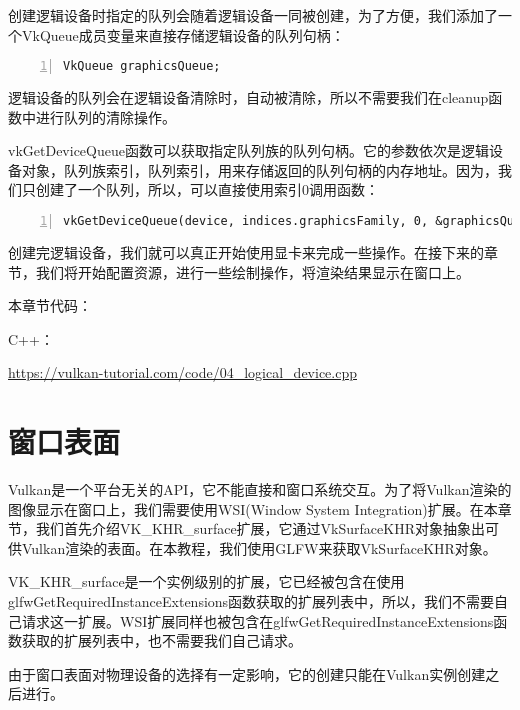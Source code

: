 \documentclass{ctexart}
\begin{document}
创建逻辑设备时指定的队列会随着逻辑设备一同被创建，为了方便，我们添加了一个VkQueue成员变量来直接存储逻辑设备的队列句柄：

\begin{lstlisting}[language={[ANSI]C},keywordstyle=\color{blue!70},commentstyle=\color{red!50!green!50!blue!50},frame=shadowbox, rulesepcolor=\color{red!20!green!20!blue!20},basicstyle=\small,numbers=left, numberstyle=\tiny,breaklines=true]
VkQueue graphicsQueue;
\end{lstlisting}

逻辑设备的队列会在逻辑设备清除时，自动被清除，所以不需要我们在cleanup函数中进行队列的清除操作。

vkGetDeviceQueue函数可以获取指定队列族的队列句柄。它的参数依次是逻辑设备对象，队列族索引，队列索引，用来存储返回的队列句柄的内存地址。因为，我们只创建了一个队列，所以，可以直接使用索引0调用函数：

\begin{lstlisting}[language={[ANSI]C},keywordstyle=\color{blue!70},commentstyle=\color{red!50!green!50!blue!50},frame=shadowbox, rulesepcolor=\color{red!20!green!20!blue!20},basicstyle=\small,numbers=left, numberstyle=\tiny,breaklines=true]
vkGetDeviceQueue(device, indices.graphicsFamily, 0, &graphicsQueue);
\end{lstlisting}

创建完逻辑设备，我们就可以真正开始使用显卡来完成一些操作。在接下来的章节，我们将开始配置资源，进行一些绘制操作，将渲染结果显示在窗口上。

本章节代码：

C++：

\url{https://vulkan-tutorial.com/code/04_logical_device.cpp}

\newpage
\section{窗口表面}

Vulkan是一个平台无关的API，它不能直接和窗口系统交互。为了将Vulkan渲染的图像显示在窗口上，我们需要使用WSI(Window System Integration)扩展。在本章节，我们首先介绍VK\_KHR\_surface扩展，它通过VkSurfaceKHR对象抽象出可供Vulkan渲染的表面。在本教程，我们使用GLFW来获取VkSurfaceKHR对象。

VK\_KHR\_surface是一个实例级别的扩展，它已经被包含在使用glfwGetRequiredInstanceExtensions函数获取的扩展列表中，所以，我们不需要自己请求这一扩展。WSI扩展同样也被包含在glfwGetRequiredInstanceExtensions函数获取的扩展列表中，也不需要我们自己请求。

由于窗口表面对物理设备的选择有一定影响，它的创建只能在Vulkan实例创建之后进行。
\end{document}
